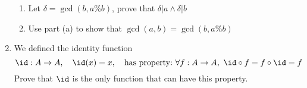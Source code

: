 \documentclass[basic, header]{nosvagor-notes}
\begin{document}
\begin{enumerate}[itemsep=10em]
\begin{enumerate}
        \item Let \(\delta = \gcd(b, a\%b)\), prove that \(\delta|a \land
          \delta|b\)

        \item Use part (a) to show that \(\gcd(a,b) = \gcd(b, a\%b)\)

      \end{enumerate}

  \newpage %

    \item We defined the identity function
      \[%
       \id : A \to A, \quad \id(x) = x, \quad  \text{has property:}~\forall f :
       A\to A,~ \id \circ f = f \circ \id = f
      \]%
      Prove that \(\id\) is the only function that can have this property.

\end{enumerate}
\end{document}
